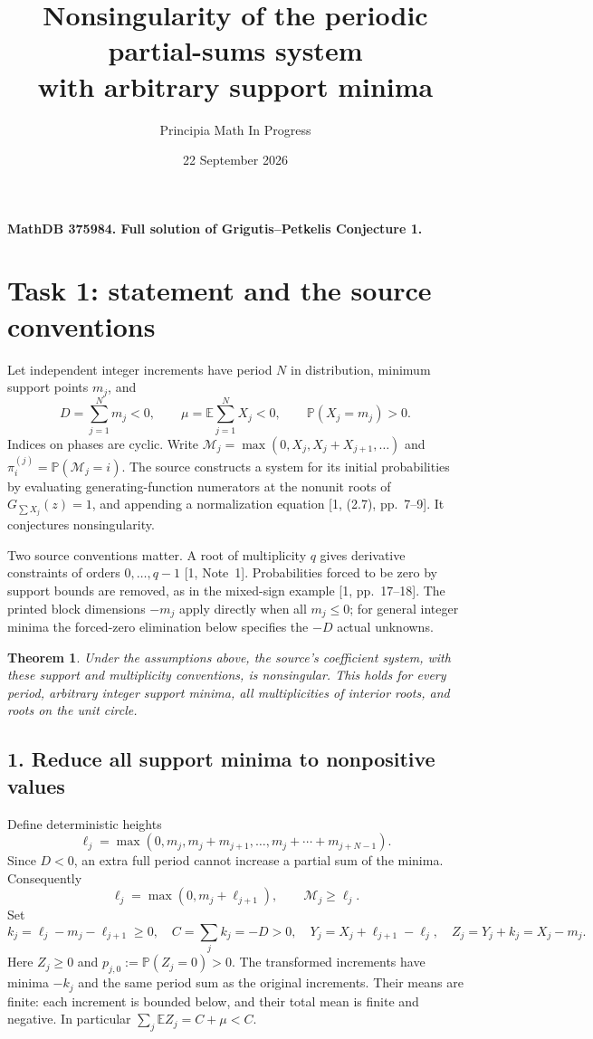 \documentclass[11pt]{article}
\title{Nonsingularity of the periodic partial-sums system\\with arbitrary support minima}
\author{Principia Math In Progress}
\date{22 September 2026}
\newtheorem{theorem}{Theorem}
\newcommand{\E}{\mathbb E}
\newcommand{\Pp}{\mathbb P}
\begin{document}
\maketitle
\noindent\textbf{MathDB 375984. Full solution of Grigutis--Petkelis Conjecture 1.}

\section*{Task 1: statement and the source conventions}
Let independent integer increments have period \(N\) in distribution,
minimum support points \(m_j\), and
\[
 D=\sum_{j=1}^Nm_j<0,\qquad
 \mu=\E\sum_{j=1}^NX_j<0,\qquad
 \Pp(X_j=m_j)>0.
\]
Indices on phases are cyclic. Write
\(\mathcal M_j=\max(0,X_j,X_j+X_{j+1},\ldots)\) and
\(\pi^{(j)}_i=\Pp(\mathcal M_j=i)\).
The source constructs a system for its initial probabilities by
evaluating generating-function numerators at the nonunit roots
of \(G_{\sum X_j}(z)=1\), and appending a normalization equation
[1, (2.7), pp.~7--9]. It conjectures nonsingularity.

Two source conventions matter. A root of multiplicity \(q\)
gives derivative constraints of orders \(0,\ldots,q-1\)
[1, Note~1]. Probabilities forced to be zero by support bounds
are removed, as in the mixed-sign example [1, pp.~17--18].
The printed block dimensions \(-m_j\) apply directly when
all \(m_j\leq0\); for general integer minima the forced-zero
elimination below specifies the \(-D\) actual unknowns.

\begin{theorem}\label{thm}
Under the assumptions above, the source's coefficient system,
with these support and multiplicity conventions, is nonsingular.
This holds for every period, arbitrary integer support minima,
all multiplicities of interior roots, and roots on the unit circle.
\end{theorem}

\subsection*{1. Reduce all support minima to nonpositive values}
Define deterministic heights
\[
 \ell_j=\max\left(0,m_j,m_j+m_{j+1},\ldots,
                         m_j+\cdots+m_{j+N-1}\right).
\]
Since \(D<0\), an extra full period cannot increase a partial
sum of the minima. Consequently
\[
 \ell_j=\max(0,m_j+\ell_{j+1}),\qquad
 \mathcal M_j\geq\ell_j.
\]
Set
\[
 k_j=\ell_j-m_j-\ell_{j+1}\geq0,\quad
 C=\sum_j k_j=-D>0,\quad
 Y_j=X_j+\ell_{j+1}-\ell_j,\quad
 Z_j=Y_j+k_j=X_j-m_j.
                                                               \tag{1}
\]
Here \(Z_j\geq0\) and \(p_{j,0}:=\Pp(Z_j=0)>0\).
The transformed increments have minima \(-k_j\) and the same
period sum as the original increments. Their means are finite:
each increment is bounded below, and their total mean is finite
and negative. In particular \(\sum_j\E Z_j=C+\mu<C\).
\end{document}
